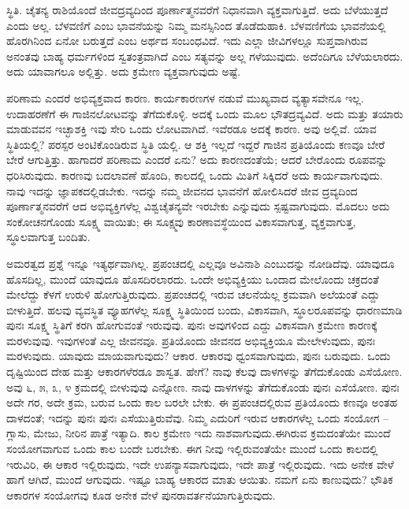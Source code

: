 ಸ್ಥಿತಿ. ಚೈತನ್ಯ ರಾಶಿಯೊಂದೆ ಜೀವದ್ರವ್ಯದಿಂದ ಪೂರ್ಣಾತ್ಮನವರೆಗೆ ನಿಧಾನವಾಗಿ ವ್ಯಕ್ತವಾಗುತ್ತಿದೆ. ಅದು ಬೆಳೆಯುತ್ತದೆ ಎಂದು ಅಲ್ಲ. ಬೆಳವಣಿಗೆ ಎಂಬ ಭಾವನೆಯನ್ನು ನಿಮ್ಮ ಮನಸ್ಸಿನಿಂದ ತೊಡೆದುಹಾಕಿ. ಬೆಳವಣಿಗೆಯ ಭಾವನೆಯಲ್ಲಿ ಹೊರಗಿನಿಂದ ಏನೋ ಬರುತ್ತದೆ ಎಂಬ ಅರ್ಥದ ಸಂಬಂಧವಿದೆ. ಇದು ಎಲ್ಲಾ ಜೀವಿಗಳಲ್ಲೂ ಸುಪ್ತವಾಗಿರುವ ಅನಂತವು ಬಾಹ್ಯ ಧರ್ಮಗಳಿಂದ ಸ್ವತಂತ್ರವಾಗಿದೆ ಎಂಬ ಸತ್ಯವನ್ನು ಅಲ್ಲ ಗಳೆಯುವುದು. ಅದೆಂದಿಗೂ ಬೆಳೆಯಲಾರದು. ಅದು ಯಾವಾಗಲೂ ಅಲ್ಲಿತ್ತು. ಅದು ಕ್ರಮೇಣ ವ್ಯಕ್ತವಾಗುವುದು ಅಷ್ಟೆ.

ಪರಿಣಾಮ ಎಂದರೆ ಅಭಿವ್ಯಕ್ತವಾದ ಕಾರಣ. ಕಾರ್ಯಕಾರಣಗಳ ನಡುವೆ ಮುಖ್ಯವಾದ ವ್ಯತ್ಯಾಸವೇನೂ ಇಲ್ಲ. ಉದಾಹರಣೆಗೆ ಈ ಗಾಜಿನಲೋಟವನ್ನು ತೆಗೆದುಕೊಳ್ಳಿ. ಅದಕ್ಕೆ ಒಂದು ಮೂಲ ಭೌತದ್ರವ್ಯವಿದೆ. ಅದು ಮತ್ತು ತಯಾರು ಮಾಡುವವನ ಇಚ್ಛಾಶಕ್ತಿ ಇವು ಸೇರಿ ಒಂದು ಲೋಟವಾಗಿದೆ. ಇವೆರಡೂ ಅದಕ್ಕೆ ಕಾರಣ. ಅವು ಅಲ್ಲಿವೆ. ಯಾವ ಸ್ಥಿತಿಯಲ್ಲಿ? ಪರಸ್ಪರ ಅಂಟಿಕೊಂಡಿರುವ ಸ್ಥಿತಿ ಯಲ್ಲಿ. ಆ ಶಕ್ತಿ ಇಲ್ಲದೆ ಇದ್ದರೆ ಗಾಜಿನ ಪ್ರತಿಯೊಂದು ಕಣವೂ ಬೇರೆ ಬೇರೆ ಆಗುತ್ತಿತ್ತು. ಹಾಗಾದರೆ ಪರಿಣಾಮ ಎಂದರೆ ಏನು? ಅದು ಕಾರಣದಂತೆಯೆ; ಆದರೆ ಬೇರೊಂದು ರೂಪವನ್ನು ಧರಿಸಿರುವುದು. ಕಾರಣವು ಬದಲಾವಣೆ ಹೊಂದಿ, ಕಾಲದಲ್ಲಿ ಒಂದು ಮಿತಿಗೆ ಸಿಕ್ಕಿದರೆ ಅದು ಕಾರ್ಯವಾಗುವುದು. ನಾವು ಇದನ್ನು ಜ್ಞಾಪಕದಲ್ಲಿಡಬೇಕು. ಇದನ್ನು ನಮ್ಮ ಜೀವನದ ಭಾವನೆಗೆ ಹೋಲಿಸಿದರೆ ಜೀವ ದ್ರವ್ಯದಿಂದ ಪೂರ್ಣಾತ್ಮನವರೆಗೆ ಆದ ಅಭಿವ್ಯಕ್ತಿಗಳೆಲ್ಲ ವಿಶ್ವಚೈತನ್ಯವೇ ಇರಬೇಕು ಎನ್ನುವುದು ಸ್ಪಷ್ಟವಾಗುವುದು. ಮೊದಲು ಅದು ಸಂಕೋಚನಗೊಂಡು ಸೂಕ್ಷ್ಮ ವಾಯಿತು; ಈ ಸೂಕ್ಷ್ಮವು ಕಾರಣಾವಸ್ಥೆಯಿಂದ ವಿಕಾಸವಾಗುತ್ತ, ವ್ಯಕ್ತವಾಗುತ್ತ, ಸ್ಥೂಲವಾಗುತ್ತ ಬಂದಿತು.

ಅಮರತ್ವದ ಪ್ರಶ್ನೆ ಇನ್ನೂ ಇತ್ಯರ್ಥವಾಗಿಲ್ಲ. ಪ್ರಪಂಚದಲ್ಲಿ ಎಲ್ಲವೂ ಅವಿನಾಶಿ ಎಂಬುದನ್ನು ನೋಡಿದೆವು. ಯಾವುದೂ ಹೊಸದಿಲ್ಲ, ಮುಂದೆ ಯಾವುದೂ ಹೊಸದಿರಲಾರದು. ಒಂದೇ ಅಭಿವ್ಯಕ್ತಿಯು ಒಂದಾದ ಮೇಲೊಂದು ಚಕ್ರದಂತೆ ಮೇಲೆದ್ದು ಕೆಳಗೆ ಉರುಳಿ ಹೋಗುತ್ತಿರುವುದು. ಪ್ರಪಂಚದಲ್ಲಿ ಇರುವ ಚಲನೆಯೆಲ್ಲ ಕ್ರಮವಾಗಿ ಅಲೆಯಂತೆ ಎದ್ದು ಬೀಳುತ್ತಿದೆ. ಹಲವು ವ್ಯವಸ್ಥಿತ ವ್ಯೂಹಗಳೆಲ್ಲ ಸೂಕ್ಷ್ಮ ಸ್ಥಿತಿಯಿಂದ ಬಂದು, ವಿಕಾಸವಾಗಿ, ಸ್ಥೂಲರೂಪವನ್ನು ಧಾರಣಮಾಡಿ ಪುನಃ ಸೂಕ್ಷ್ಮ ಸ್ಥಿತಿಗೆ ಕರಗಿ ಹೋಗುವಂತೆ ಇರುವುವು. ಪುನಃ ಅವುಗಳಿಂದ ಎದ್ದು ವಿಕಾಸವಾಗಿ ಕ್ರಮೇಣ ಕಾರಣಕ್ಕೆ ಮರಳುವುವು. ಇವುಗಳಂತೆ ಎಲ್ಲ ಜೀವನವೂ. ಪ್ರತಿಯೊಂದು ಜೀವನದ ಅಭಿವ್ಯಕ್ತಿಯೂ ಮೇಲೇಳುವುದು, ಪುನಃ ಮರಳುವುದು. ಯಾವುದು ಮಾಯವಾಗುವುದು? ಆಕಾರ. ಆಕಾರವು ಧ್ವಂಸವಾಗುವುದು, ಪುನಃ ಬರುವುದು. ಒಂದು ದೃಷ್ಟಿಯಿಂದ ದೇಹ ಮತ್ತು ಆಕಾರಗಳೆರಡೂ ಶಾಸ್ವತ. ಹೇಗೆ? ನಾವು ಕೆಲವು ದಾಳಗಳನ್ನು ತೆಗೆದುಕೊಂಡು ಎಸೆಯೋಣ. ಅವು ೬, ೫, ೩, ೪ ಕ್ರಮದಲ್ಲಿ ಬೀಳುವುವು ಎನ್ನೋಣ. ನಾವು ದಾಳಗಳನ್ನು ತೆಗೆದುಕೊಂಡು ಪುನಃ ಎಸೆಯೋಣ. ಪುನಃ ಅದೇ ಗರ, ಅದೇ ಕ್ರಮ, ಬರುವ ಒಂದು ಕಾಲ ಬರಲೇ ಬೇಕು. ಈ ಪ್ರಪಂಚದಲ್ಲಿರುವ ಪ್ರತಿಯೊಂದು ಕಣವೂ ಅಂತಹ ದಾಳದಂತೆ; ಇದನ್ನು ಪುನಃ ಪುನಃ ಎಸೆಯುತ್ತಿರುವೆವು. ನಿಮ್ಮ ಎದುರಿಗೆ ಇರುವ ಆಕಾರಗಳೆಲ್ಲ ಒಂದು ಸಂಯೋಗ – ಗ್ಲಾಸು, ಮೇಜು, ನೀರಿನ ಪಾತ್ರೆ ಇತ್ಯಾದಿ. ಕಾಲ ಕ್ರಮೇಣ ಇದು ನಾಶವಾಗುವುದು.ಈಗಿರುವ ಕ್ರಮದಂತೆಯೇ ಮುಂದೆ ಸಂಯೋಗವಾಗುವ ಒಂದು ಕಾಲ ಬಂದೇ ಬರಬೇಕು. ಈಗ ನೀವು ಇಲ್ಲಿರುವಂತೆಯೇ ಮುಂದೆ ಒಂದು ಕಾಲದಲ್ಲಿ ಇರುವಿರಿ, ಈ ಆಕಾರ ಇಲ್ಲಿರುವುದು, ಇದೇ ಉಪನ್ಯಾಸವಾಗುವುದು, ಇದೇ ಪಾತ್ರೆ ಇಲ್ಲಿರುವುದು. ಇದು ಅನೇಕ ವೇಳೆ ಹಾಗೆ ಆಗಿದೆ, ಮುಂದೆ ಆಗುವುದು. ಇಷ್ಟೂ ಬಾಹ್ಯ ಆಕಾರದ ಮಾತು ಆಯಿತು. ನಮಗೆ ಏನು ಕಾಣುವುದು? ಭೌತಿಕ ಆಕಾರಗಳ ಸಂಯೋಗವು ಕೂಡ ಅನೇಕ ವೇಳೆ ಪುನರಾವರ್ತನೆಯಾಗುತ್ತಿರುವುದು.

